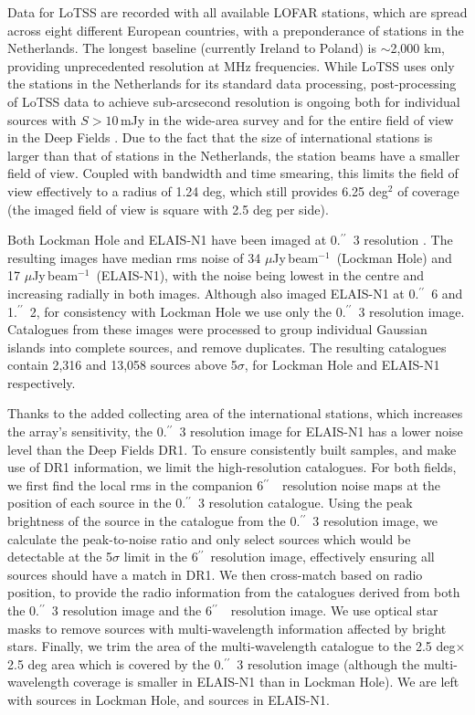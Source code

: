 \documentclass[usenatbib,fleqn,letters]{mnras}
\newcommand{\sarc}{$^{\prime\prime}\!\!$}
\newcommand{\muJybm}{$\mu$Jy$\,$beam$^{-1}$}
\begin{document}
Data for LoTSS are recorded with all available LOFAR stations, which are spread across eight different European countries, with a preponderance of stations in the Netherlands. The longest baseline (currently Ireland to Poland) is $\sim$2,000 km, providing unprecedented resolution at MHz frequencies. While LoTSS uses only the stations in the Netherlands for its standard data processing, post-processing of LoTSS data to achieve sub-arcsecond resolution is ongoing both for individual sources with $S>10\,$mJy in the wide-area survey \citep{morabito_sub-arcsecond_2022} and for the entire field of view in the Deep Fields \citep[][Escott et al., in prep; Bondi et al., in prep]{sweijen_deep_2022,de_jong_into_2024}. Due to the fact that the size of international stations is larger than that of stations in the Netherlands, the station beams have a smaller field of view. Coupled with bandwidth and time smearing, this limits the field of view effectively to a radius of 1.24 deg, which still provides 6.25 deg$^2$ of coverage (the imaged field of view is square with 2.5 deg per side). 

Both Lockman Hole and ELAIS-N1 have been imaged at 0.\sarc\ 3 resolution \citep[][respectively]{sweijen_deep_2022,de_jong_into_2024}. The resulting images have median rms noise of 34 \muJybm\ (Lockman Hole) and 17 \muJybm\ (ELAIS-N1), with the noise being lowest in the centre and increasing radially in both images. Although \cite{de_jong_into_2024} also imaged ELAIS-N1 at 0.\sarc\ 6 and 1.\sarc\ 2, for consistency with Lockman Hole we use only the 0.\sarc\ 3 resolution image. Catalogues from these images were processed to group individual Gaussian islands into complete sources, and remove duplicates. The resulting catalogues contain 2,316 and 13,058 sources above 5$\sigma$, for Lockman Hole and ELAIS-N1 respectively. 

Thanks to the added collecting area of the international stations, which increases the array's sensitivity, the 0.\sarc\ 3 resolution image for ELAIS-N1 has a lower noise level than the Deep Fields DR1. To ensure consistently built samples, and make use of DR1 information, we limit the high-resolution catalogues. For both fields, we first find the local rms in the companion 6\sarc\ \ resolution noise maps at the position of each source in the 0.\sarc\ 3 resolution catalogue. Using the peak brightness of the source in the catalogue from the 0.\sarc\ 3 resolution image, we calculate the peak-to-noise ratio and only select sources which would be detectable at the 5$\sigma$ limit in the 6\sarc\ resolution image, effectively ensuring all sources should have a match in DR1. We then cross-match based on radio position, to provide the radio information from the catalogues derived from both the 0.\sarc\ 3 resolution image and the 6\sarc\ \ resolution image. We use optical star masks to remove sources with multi-wavelength information affected by bright stars. Finally, we trim the area of the multi-wavelength catalogue to the 2.5 deg$\times$2.5 deg area which is covered by the 0.\sarc\ 3 resolution image (although the multi-wavelength coverage is smaller in ELAIS-N1 than in Lockman Hole). 
We are left with sources in Lockman Hole, and sources in ELAIS-N1. 
\end{document}
